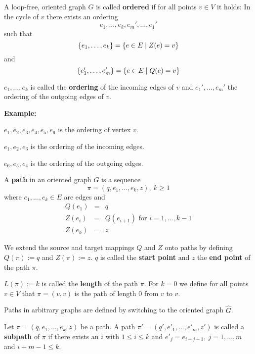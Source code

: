 \bigskip
\begin{definition}
A loop-free, oriented graph $G$ is called {\bf ordered} if for all points
$v \in V$ it	holds: In the cycle of $v$ there exists an ordering 
\[ e_1, \ldots, e_k, e_m', \ldots, e_1'\]
such that
\[ \mbox{$\{e_1, \ldots, e_k\}$} = \mbox{$\{e \in E \mid Z(e) = v\}$} \]
and 
\[ \mbox{$\{e_1', \ldots, e_m'\}$} = \mbox{$\{e \in E \mid Q(e) = v\}$} \]
\end{definition}

$e_1, \ldots, e_k$ is called the {\bf ordering} of the incoming edges of $v$ and
$e_1', \ldots, e_m'$ the ordering of the outgoing edges of $v$.

{\bf Example:}

\begin{center}

\end{center}

$e_1,e_2,e_3,e_4,e_5,e_6$ is the ordering of vertex $v$.

$e_1,e_2,e_3$ is the ordering of the incoming edges.

$e_6,e_5,e_4$ is the ordering of the outgoing edges.

\bigskip
\begin{definition}
A {\bf path} in an oriented graph $G$ is a sequence 
\[ \pi = (q, e_1, \ldots, e_k, z),\ k \geq 1 \]
where $ e_1, \ldots, e_k \in E$ are edges and
\begin{eqnarray*}
Q(e_1) & = & q \\
Z(e_{i}) & = & Q(e_{i+1})\text{ for }i = 1, \ldots, k-1 \\
Z(e_k) & = & z 
\end{eqnarray*}
\end{definition}

We extend the source and target mappings $Q$ and $Z$ onto paths by defining
$Q(\pi) := q$ and $Z(\pi) := z$. $q$ is called the {\bf start point} and $z$ the {\bf end
point} of the path $\pi$.

$L(\pi) := k$ is called the {\bf length} of the path $\pi$. For $k = 0$ we
define for all points $v \in V$ that $\pi = (v, v)$ is the path of length 0 from
$v$ to $v$.

Paths in arbitrary graphs are defined by switching to the oriented graph
$\hat{G}$.

\bigskip
\begin{definition}
Let $\pi = (q, e_1, \ldots, e_k, z)$ be a path. A path $\pi' = (q', e'_1,
\ldots, e'_m, z')$ is called a {\bf subpath} of $\pi$ if there exists an $i$
with $1 \leq i \leq k$ and $e'_j = e_{i+j-1},\ j = 1, \ldots, m$ and $i + m -
1 \leq k$.
\end{definition}


